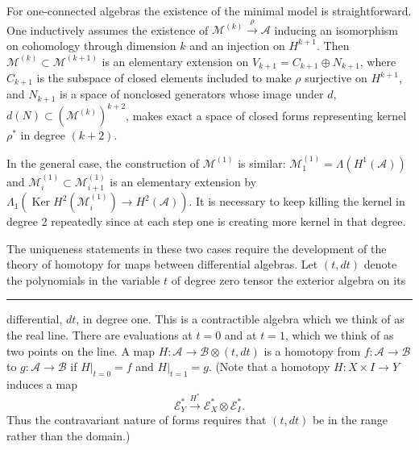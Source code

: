 \documentclass[
  english,
  a3paper,
  a3paper]{extarticle}
\begin{document}
For one-connected algebras the existence of the minimal model is
straightforward. One inductively assumes the existence of
\(\mathcal M^{(k)}\xrightarrow{\rho}\mathscr A\) inducing an isomorphism
on cohomology through dimension \(k\) and an injection on \(H^{k+1}\).
Then \(\mathcal M^{(k)}\subset\mathcal M^{(k+1)}\) is an elementary
extension on \(V_{k+1}=C_{k+1}\oplus N_{k+1}\), where \(C_{k+1}\) is the
subspace of closed elements included to make \(\rho\) surjective on
\(H^{k+1}\), and \(N_{k+1}\) is a space of nonclosed generators whose
image under \(d\), \(d(N)\subset(\mathcal M^{(k)})^{k+2}\), makes exact
a space of closed forms representing kernel \(\rho^*\) in degree
\((k+2)\).

In the general case, the construction of \(\mathcal M^{(1)}\) is
similar: \(\mathcal M_1^{(1)}=\Lambda(H^1(\mathscr A))\) and
\(\mathcal M_i^{(1)}\subset\mathcal M_{i+1}^{(1)}\) is an elementary
extension by
\(\Lambda_1(\operatorname{Ker}H^2(\mathcal M_i^{(1)})\to H^2(\mathscr A))\).
It is necessary to keep killing the kernel in degree 2 repeatedly since
at each step one is creating more kernel in that degree.

The uniqueness statements in these two cases require the development of
the theory of homotopy for maps between differential algebras. Let
\((t,dt)\) denote the polynomials in the variable \(t\) of degree zero
tensor the exterior algebra on its

\clearpage



\par

\vspace{0.7mm}\hrule\vspace{1.6mm}

\fontsize{9}{11}\selectfont

differential, \(dt\), in degree one. This is a contractible algebra
which we think of as the real line. There are evaluations at \(t=0\) and
at \(t=1\), which we think of as two points on the line. A map
\(H:\mathscr A\to\mathscr B\otimes(t,dt)\) is a homotopy from
\(f:\mathscr A\to\mathscr B\) to \(g:\mathscr A\to\mathscr B\) if
\(H|_{t=0}=f\) and \(H|_{t=1}=g\). (Note that a homotopy
\(H:X\times I\to Y\) induces a map \[
\mathscr E_Y^*\xrightarrow{H^*}\mathscr E_X^*\otimes\mathscr E_I^*.
\] Thus the contravariant nature of forms requires that \((t,dt)\) be in
the range rather than the domain.)
\end{document}

